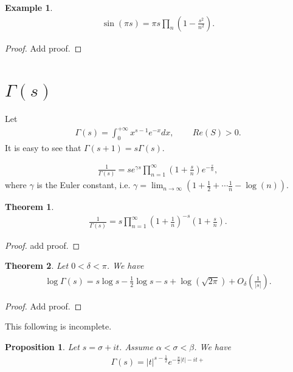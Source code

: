\documentclass[a4paper,10pt]{amsart}
\newtheorem{example}{Example}[section]
\newtheorem{theorem}{Theorem}[section]
\newtheorem{proposition}{Proposition}[section]
\begin{document}
\begin{example}
   \begin{align*}
       \sin(\pi s) = \pi s \prod_{n}(1-\frac{s^2}{n^2}). 
   \end{align*} 
\end{example}

\begin{proof}
   Add proof. 
\end{proof}


\section{$\Gamma(s)$}
Let 
\begin{align*}
    \Gamma(s) = \int_{0}^{+\infty} x^{s-1}e^{-x} dx \mbox{, } \qquad 
    Re(S) > 0. 
\end{align*}
It is easy to see that $\Gamma(s+1) = s\Gamma(s)$.

\begin{align*}
    \frac{1}{\Gamma(s)} = se^{\gamma s}\prod_{n=1}^{\infty}(1+\frac{s}{n})
    e^{-\frac{s}{n}},
\end{align*}
where $\gamma$ is the Euler constant, i.e. $\gamma = \lim_{n \rightarrow
\infty} (1 + \frac{1}{2} + \cdots \frac{1}{n} - \log(n))$.

\begin{theorem}
   \begin{align*}
       \frac{1}{\Gamma(s)} = s \prod_{n=1}^{\infty}(1+\frac{1}{n})^{-s}
       (1+ \frac{s}{n}). 
   \end{align*} 
\end{theorem}

\begin{proof}
   add proof. 
\end{proof}


\begin{theorem}
   Let $0 < \delta < \pi$. We have
   \begin{align*}
       \log \Gamma(s) = s \log s - \frac{1}{2}\log s - s 
       + \log (\sqrt{2\pi}) + O_{\delta}(\frac{1}{|s|}). 
   \end{align*}
\end{theorem}

\begin{proof}
   Add proof. 
\end{proof}


This following is incomplete.
\begin{proposition}
   Let $s = \sigma + it$. Assume $\alpha < \sigma < \beta$. We have
   \begin{align*}
       \Gamma(s) = |t|^{s - \frac{1}{2}} e^{-\frac{\pi}{2}|t| -it +
       } 
   \end{align*}
\end{proposition}
\end{document}

